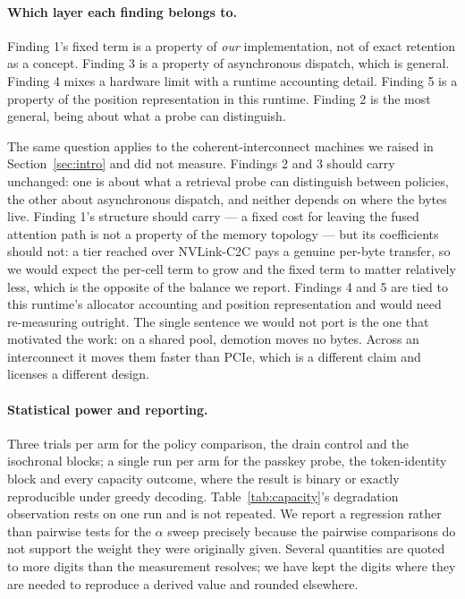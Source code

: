 \documentclass[manuscript,anonymous,review]{acmart}
\begin{document}
\paragraph{Which layer each finding belongs to.} Finding 1's fixed term
is a property of \emph{our} implementation, not of exact retention as
a concept. Finding 3 is a property of asynchronous dispatch, which is
general. Finding 4 mixes a hardware limit with a runtime accounting
detail. Finding 5 is a property of the position representation in this
runtime. Finding 2 is the most general, being about what a probe can
distinguish.

The same question applies to the coherent-interconnect machines we
raised in Section~\ref{sec:intro} and did not measure. Findings 2 and 3
should carry unchanged: one is about what a retrieval probe can
distinguish between policies, the other about asynchronous dispatch,
and neither depends on where the bytes live. Finding 1's structure
should carry --- a fixed cost for leaving the fused attention path is
not a property of the memory topology --- but its coefficients should
not: a tier reached over NVLink-C2C pays a genuine per-byte transfer,
so we would expect the per-cell term to grow and the fixed term to
matter relatively less, which is the opposite of the balance we
report. Findings 4 and 5 are tied to this runtime's allocator
accounting and position representation and would need re-measuring
outright. The single sentence we would not port is the one that
motivated the work: on a shared pool, demotion moves no bytes. Across
an interconnect it moves them faster than PCIe, which is a different
claim and licenses a different design.

\paragraph{Statistical power and reporting.} Three trials per arm for
the policy comparison, the drain control and the isochronal blocks; a
single run per arm for the passkey probe, the token-identity block and
every capacity outcome, where the result is binary or exactly
reproducible under greedy decoding. Table~\ref{tab:capacity}'s degradation
observation rests on one run and is not repeated. We report a
regression rather than pairwise tests for the
$\alpha$ sweep precisely because the pairwise comparisons do not
support the weight they were originally given. Several quantities are quoted to more digits than the
measurement resolves; we have kept the digits where they are needed to
reproduce a derived value and rounded elsewhere.
\end{document}
